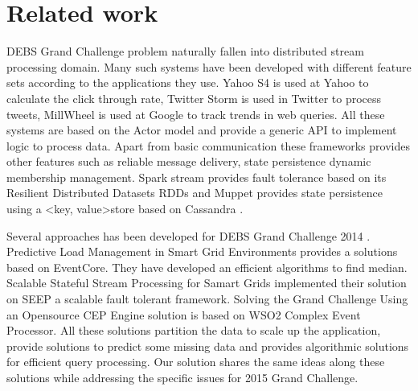 \section{Related work}
DEBS Grand Challenge problem naturally fallen into distributed stream processing domain. Many such systems have been developed with different feature sets according to the applications they use. Yahoo S4 \cite{neumeyer2010s4} is used at Yahoo to calculate the click through rate, Twitter Storm \cite{toshniwal2014storm} is used in Twitter to process tweets, MillWheel \cite{akidau2013millwheel} is used at Google to track trends in web queries. All these systems are based on the Actor model \cite{agha1985actors} and provide a generic API to implement logic to process data. Apart from basic communication these frameworks provides other features such as reliable message delivery, state persistence dynamic membership management. Spark stream \cite{zaharia2012discretized} provides fault tolerance based on its Resilient Distributed Datasets RDDs \cite{zaharia2012resilient} and Muppet \cite{lam2012muppet} provides state persistence using a \textless key, value\textgreater store based on Cassandra \cite{lakshman2010cassandra}. 

Several approaches has been developed for DEBS Grand Challenge 2014 \cite{jerzak2014debs}. Predictive Load Management in Smart Grid Environments \cite{mutschler2014predictive} provides a solutions based on EventCore. They have developed an efficient algorithms to find median. Scalable Stateful Stream Processing for Samart Grids \cite{fernandez2014scalable} implemented their solution on SEEP \cite{castro2013integrating} a scalable fault tolerant framework. Solving the Grand Challenge Using an Opensource CEP Engine \cite{perera2014solving} solution is based on WSO2 Complex Event Processor. All these solutions partition the data to scale up the application, provide solutions to predict some missing data and provides algorithmic solutions for efficient query processing. Our solution shares the same ideas along these solutions while addressing the specific issues for 2015 Grand Challenge.
